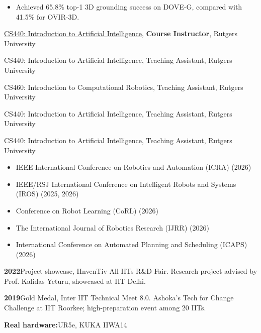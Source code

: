 \begin{papers}
{\begin{itemize}[leftmargin=12pt,label=\textbullet,itemsep=1pt,parsep=0pt,topsep=2pt]
\item Achieved 65.8\% top-1 3D grounding success on DOVE-G, compared with 41.5\% for OVIR-3D.\end{itemize}}
\end{papers}
\begin{description}[leftmargin=78pt,labelwidth=70pt,labelsep=8pt,align=left,font=\normalfont,itemsep=3pt,parsep=0pt,topsep=0pt]
\item[Fall 2026] \href{https://kowndinya2000.github.io/cs440-fa26/}{CS440: Introduction to Artificial Intelligence}, \textbf{Course Instructor}, Rutgers University
\item[Spring 2026] CS440: Introduction to Artificial Intelligence, Teaching Assistant, Rutgers University
\item[Fall 2025] CS460: Introduction to Computational Robotics, Teaching Assistant, Rutgers University
\item[Spring 2025] CS440: Introduction to Artificial Intelligence, Teaching Assistant, Rutgers University
\item[Fall 2024] CS440: Introduction to Artificial Intelligence, Teaching Assistant, Rutgers University
\end{description}
\begin{itemize}[leftmargin=13pt,itemsep=2pt,parsep=0pt,topsep=3pt]
\item IEEE International Conference on Robotics and Automation (ICRA) (2026)
\item IEEE/RSJ International Conference on Intelligent Robots and Systems (IROS) (2025, 2026)
\item Conference on Robot Learning (CoRL) (2026)
\item The International Journal of Robotics Research (IJRR) (2026)
\item International Conference on Automated Planning and Scheduling (ICAPS) (2026)
\end{itemize}
\textbf{2022}\enspace Project showcase, IInvenTiv All IITs R\&D Fair. {\small Research project advised by Prof. Kalidas Yeturu, showcased at IIT Delhi.}\par\vspace{4pt}
\textbf{2019}\enspace Gold Medal, Inter IIT Technical Meet 8.0. {\small Ashoka's Tech for Change Challenge at IIT Roorkee; high-preparation event among 20 IITs.}\par\vspace{4pt}
\textbf{Real hardware:}\enspace UR5e, KUKA IIWA14\par\vspace{2pt}
